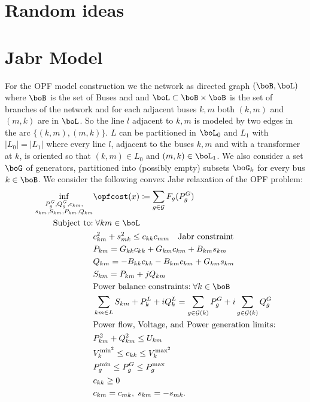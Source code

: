 \documentclass{article}
\begin{document}
\section{Random ideas}


\section{Jabr Model}



For the OPF model construction we the network as directed graph
$(\boB,\boL)$ where $\boB$ is the set of Buses and and $\boL \subset \boB \times \boB$ is the 
set of branches of the network and for each adjacent buses $k,m$ both $(k,m)$ and $(m,k)$ are
in $\boL$. So the line $l$ adjacent to $k,m$ is modeled by two edges in the arc $\{(k,m),(m,k)\}$.
$L$ can be partitioned in $\boL_0$ and $L_1$ with $|L_0|=|L_1|$ where every line $l$, adjacent 
to the buses $k,m$ and with a transformer at $k$, is oriented so that $(k,m) \in L_0$ and 
$(m,k) \in \boL_1$. We also consider a set $\boG$ of generators, partitioned into 
(possibly empty) subsets $\boG_k$ for every bus $k \in \boB$.
We consider the following convex Jabr relaxation of the OPF problem:
\begin{align}
  \label{Jabr equality model}
  \inf_{\substack{P^G_g, Q^G_g, c_{km}, \\ s_{km}, S_{km}, P_{km}, Q_{km}}} & \opfcost(x) \coloneqq \sum_{g \in \mathcal{G}}{F_g(P_g^G)} \\
  \text{Subject to:} & \; \forall km \in \boL \nonumber \\
  & c_{km}^2 + s_{mk}^2 \leq c_{kk}c_{mm} \quad \text{Jabr constraint} \label{Jabr constraint}\\
  & P_{km} = G_{kk}c_{kk}+G_{km}c_{km}+B_{km}s_{km} \label{c to P} \\
  & Q_{km} = -B_{kk}c_{kk}-B_{km}c_{km}+G_{km}s_{km} \label{c to Q}\\
  & S_{km} = P_{km} + jQ_{km} \label{PQ to S}\\
  & \text{Power balance constraints:}\; \forall k \in \boB\nonumber \\
  & \sum_{km \in L}S_{km}+P_k^L+iQ_k^L = \sum_{g \in \mathcal{G}(k)}{P_g^G} + i\sum_{g \in \mathcal{G}(k)}{Q_g^G} \label{constr: Power Flow Constraint J}\\
  & \text{Power flow, Voltage, and Power generation limits:} \nonumber \\
  & P_{km}^2 + Q_{km}^2 \leq U_{km} \label{Power Flow Magnitude Constraint J}\\
  & V_k^{\text{min}^2} \leq c_{kk} \leq V_k^{\text{max}^2} \label{Voltage Magnitude Constraint J} \\
  & P_g^{\text{min}} \leq P_g^G \leq P_g^{\text{max}}\label{Power generation Magnitude Constraint J} \\
  & c_{kk} \geq 0 \; \\ 
  & c_{km} = c_{mk}, \;s_{km} = - s_{mk}.
  \end{align}
\end{document}
